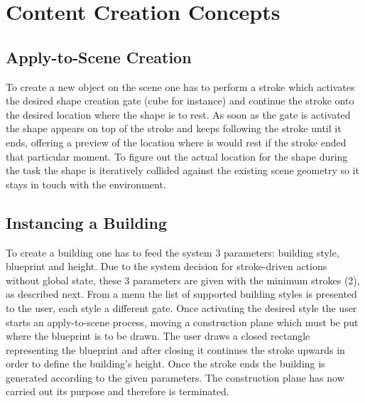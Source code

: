 

\section{Content Creation Concepts}

\subsection{Apply-to-Scene Creation}
\label{design:apply-to-scene}

To create a new object on the scene one has to perform a stroke which activates the desired shape creation gate (cube for instance)
and continue the stroke onto the desired location where the shape is to rest. As soon as the gate is activated the shape appears
on top of the stroke and keeps following the stroke until it ends, offering a preview of the location where is would rest
if the stroke ended that particular moment.
To figure out the actual location for the shape during the task the shape is iteratively collided against the
existing scene geometry so it stays in touch with the environment.




\subsection{Instancing a Building}
\label{design:building}

To create a building one has to feed the system 3 parameters: building style, blueprint and height.
Due to the system decision for stroke-driven actions without global state, these 3 parameters are given with the
minimum strokes (2), as described next.
From a menu the list of supported building styles is presented to the user, each style a different gate.
Once activating the desired style the user starts an apply-to-scene process, moving a construction plane which must
be put where the blueprint is to be drawn.
The user draws a closed rectangle representing the blueprint and after closing it continues
the stroke upwards in order to define the building's height.
Once the stroke ends the building is generated according to the given parameters.
The construction plane has now carried out its purpose and therefore is terminated.


